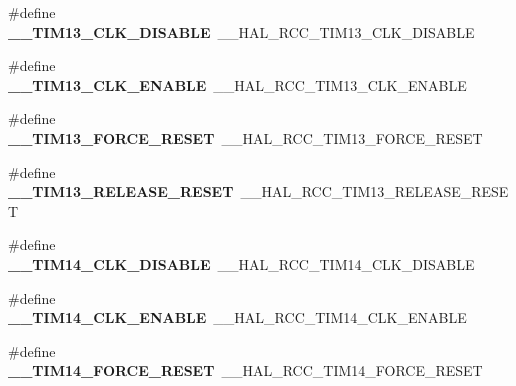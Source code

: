 \begin{DoxyCompactItemize}
\item 
\hypertarget{group___h_a_l___r_c_c___aliased_gacfec356657ad501040bd9429cbdaa07f}{\#define {\bfseries \-\_\-\-\_\-\-T\-I\-M13\-\_\-\-C\-L\-K\-\_\-\-D\-I\-S\-A\-B\-L\-E}~\-\_\-\-\_\-\-H\-A\-L\-\_\-\-R\-C\-C\-\_\-\-T\-I\-M13\-\_\-\-C\-L\-K\-\_\-\-D\-I\-S\-A\-B\-L\-E}\label{group___h_a_l___r_c_c___aliased_gacfec356657ad501040bd9429cbdaa07f}

\item 
\hypertarget{group___h_a_l___r_c_c___aliased_gaad8f664f4f9f4425f5ca94591107a7a7}{\#define {\bfseries \-\_\-\-\_\-\-T\-I\-M13\-\_\-\-C\-L\-K\-\_\-\-E\-N\-A\-B\-L\-E}~\-\_\-\-\_\-\-H\-A\-L\-\_\-\-R\-C\-C\-\_\-\-T\-I\-M13\-\_\-\-C\-L\-K\-\_\-\-E\-N\-A\-B\-L\-E}\label{group___h_a_l___r_c_c___aliased_gaad8f664f4f9f4425f5ca94591107a7a7}

\item 
\hypertarget{group___h_a_l___r_c_c___aliased_ga93a1ee53bfd837e622370714d258835e}{\#define {\bfseries \-\_\-\-\_\-\-T\-I\-M13\-\_\-\-F\-O\-R\-C\-E\-\_\-\-R\-E\-S\-E\-T}~\-\_\-\-\_\-\-H\-A\-L\-\_\-\-R\-C\-C\-\_\-\-T\-I\-M13\-\_\-\-F\-O\-R\-C\-E\-\_\-\-R\-E\-S\-E\-T}\label{group___h_a_l___r_c_c___aliased_ga93a1ee53bfd837e622370714d258835e}

\item 
\hypertarget{group___h_a_l___r_c_c___aliased_ga6f650b47d31086ec19b1c1a146124930}{\#define {\bfseries \-\_\-\-\_\-\-T\-I\-M13\-\_\-\-R\-E\-L\-E\-A\-S\-E\-\_\-\-R\-E\-S\-E\-T}~\-\_\-\-\_\-\-H\-A\-L\-\_\-\-R\-C\-C\-\_\-\-T\-I\-M13\-\_\-\-R\-E\-L\-E\-A\-S\-E\-\_\-\-R\-E\-S\-E\-T}\label{group___h_a_l___r_c_c___aliased_ga6f650b47d31086ec19b1c1a146124930}

\item 
\hypertarget{group___h_a_l___r_c_c___aliased_gae9d1d7754509af407addaa6e96e35e95}{\#define {\bfseries \-\_\-\-\_\-\-T\-I\-M14\-\_\-\-C\-L\-K\-\_\-\-D\-I\-S\-A\-B\-L\-E}~\-\_\-\-\_\-\-H\-A\-L\-\_\-\-R\-C\-C\-\_\-\-T\-I\-M14\-\_\-\-C\-L\-K\-\_\-\-D\-I\-S\-A\-B\-L\-E}\label{group___h_a_l___r_c_c___aliased_gae9d1d7754509af407addaa6e96e35e95}

\item 
\hypertarget{group___h_a_l___r_c_c___aliased_ga17ea8a6c97269b92eb4c267565e1504c}{\#define {\bfseries \-\_\-\-\_\-\-T\-I\-M14\-\_\-\-C\-L\-K\-\_\-\-E\-N\-A\-B\-L\-E}~\-\_\-\-\_\-\-H\-A\-L\-\_\-\-R\-C\-C\-\_\-\-T\-I\-M14\-\_\-\-C\-L\-K\-\_\-\-E\-N\-A\-B\-L\-E}\label{group___h_a_l___r_c_c___aliased_ga17ea8a6c97269b92eb4c267565e1504c}

\item 
\hypertarget{group___h_a_l___r_c_c___aliased_gae83b078b087527043d44dcb3c00b2396}{\#define {\bfseries \-\_\-\-\_\-\-T\-I\-M14\-\_\-\-F\-O\-R\-C\-E\-\_\-\-R\-E\-S\-E\-T}~\-\_\-\-\_\-\-H\-A\-L\-\_\-\-R\-C\-C\-\_\-\-T\-I\-M14\-\_\-\-F\-O\-R\-C\-E\-\_\-\-R\-E\-S\-E\-T}\label{group___h_a_l___r_c_c___aliased_gae83b078b087527043d44dcb3c00b2396}


\end{DoxyCompactItemize}
